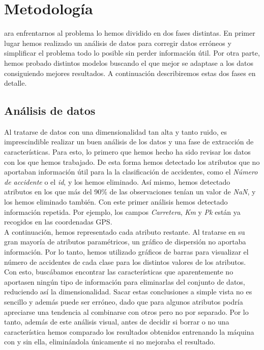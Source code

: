\documentclass[journal,twoside]{JoPhA}
\begin{document}
\section{Metodología}
ara enfrentarnos al problema lo hemos dividido en dos fases distintas. En primer lugar hemos realizado un análisis de datos para corregir datos erróneos y simplificar el problema todo lo posible sin perder información útil. Por otra parte, hemos probado distintos modelos buscando el que mejor se adaptase a los datos consiguiendo mejores resultados. A continuación describiremos estas dos fases en detalle.

\subsection{Análisis de datos}
Al tratarse de datos con una dimensionalidad tan alta y tanto ruido, es imprescindible realizar un buen análisis de los datos y una fase de extracción de características. Para esto, lo primero que hemos hecho ha sido revisar los datos con los que hemos trabajado. De esta forma hemos detectado los atributos que no aportaban información útil para la la clasificación de accidentes, como el \textit{Número de accidente} o el \textit{id}, y los hemos eliminado. Así mismo, hemos detectado atributos en los que más del 90\% de las observaciones tenían un valor de \textit{NaN}, y los hemos eliminado también. Con este primer análisis hemos detectado información repetida. Por ejemplo, los campos \textit{Carretera}, \textit{Km} y \textit{Pk} están ya recogidos en las coordenadas GPS. \\

A continuación, hemos representado cada atributo restante. Al tratarse en su gran mayoría de atributos paramétricos, un gráfico de dispersión no aportaba información. Por lo tanto, hemos utilizado gráficos de barras para visualizar el número de accidentes de cada clase para los distintos valores de los atributos. Con esto, buscábamos encontrar las características que aparentemente no aportasen ningún tipo de información para eliminarlas del conjunto de datos, reduciendo así la dimensionalidad. Sacar estas conclusiones a simple vista no es sencillo y además puede ser erróneo, dado que para algunos atributos podría apreciarse una tendencia al combinarse con otros pero no por separado. Por lo tanto, además de este análisis visual, antes de decidir si borrar o no una característica hemos comparado los resultados obtenidos entrenando la máquina con y sin ella, eliminándola únicamente si no mejoraba el resultado. \\
\end{document}
